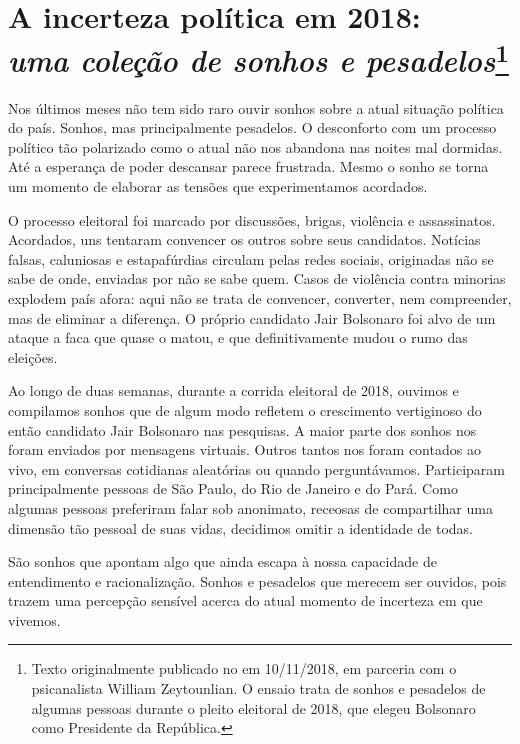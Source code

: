 \chapter*{A incerteza política em 2018:\\ \emph{uma coleção de sonhos e pesadelos}\footnote[*]{Texto originalmente publicado no {} em 10/11/2018, em parceria com o psicanalista William Zeytounlian. O ensaio trata de sonhos e pesadelos de algumas pessoas durante o pleito eleitoral de 2018, que elegeu Bolsonaro como Presidente da República.}}

\label{sonhos}

Nos últimos meses não tem sido raro ouvir sonhos sobre a atual situação
política do país. Sonhos, mas principalmente pesadelos. O desconforto com
um processo político tão polarizado como o atual não nos abandona nas
noites mal dormidas. Até a esperança de poder descansar parece
frustrada. Mesmo o sonho se torna um momento de elaborar as tensões que
experimentamos acordados.

O processo eleitoral foi marcado por discussões, brigas, violência e
assassinatos. Acordados, uns tentaram convencer os outros sobre seus
candidatos. Notícias falsas, caluniosas e estapafúrdias circulam pelas
redes sociais, originadas não se sabe de onde, enviadas por não se sabe
quem. Casos de violência contra minorias explodem país afora: aqui não
se trata de convencer, converter, nem compreender, mas de eliminar a
diferença. O próprio candidato Jair Bolsonaro foi alvo de um ataque a
faca que quase o matou, e que definitivamente mudou o rumo das eleições.

Ao longo de duas semanas, durante a corrida eleitoral de 2018, ouvimos e
compilamos sonhos que de algum modo refletem o crescimento vertiginoso
do então candidato Jair Bolsonaro nas pesquisas. A maior parte dos
sonhos nos foram enviados por mensagens virtuais. Outros tantos nos
foram contados ao vivo, em conversas cotidianas aleatórias ou quando
perguntávamos. Participaram principalmente pessoas de São Paulo, do Rio
de Janeiro e do Pará. Como algumas pessoas preferiram falar sob
anonimato, receosas de compartilhar uma dimensão tão pessoal de suas
vidas, decidimos omitir a identidade de todas.

São sonhos que apontam algo que ainda escapa à nossa capacidade de
entendimento e racionalização. Sonhos e pesadelos que merecem ser
ouvidos, pois trazem uma percepção sensível acerca do atual momento de
incerteza em que vivemos.

